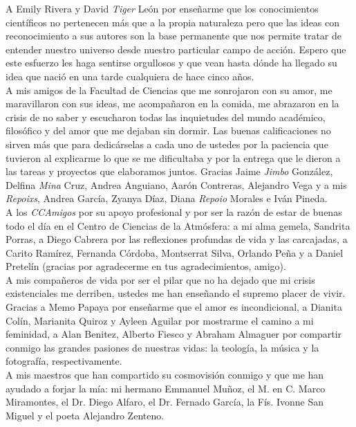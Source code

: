 A Emily Rivera y David \textit{Tiger} León por enseñarme que los conocimientos científicos no pertenecen más que a la propia naturaleza pero que las ideas con reconocimiento a sus autores son la base permanente que nos permite tratar de entender nuestro universo desde nuestro particular campo de acción. Espero que este esfuerzo les haga sentirse orgullosos y que vean hasta dónde ha llegado su idea que nació en una tarde cualquiera de hace cinco años.\\

A mis amigos de la Facultad de Ciencias que me sonrojaron con su amor, me maravillaron con sus ideas, me acompañaron en la comida, me abrazaron en la crisis de no saber y escucharon todas las inquietudes del mundo académico, filosófico y del amor que me dejaban sin dormir. Las buenas calificaciones no sirven más que para dedicárselas a cada uno de ustedes por la paciencia que tuvieron al explicarme lo que se me dificultaba y por la entrega que le dieron a las tareas y proyectos que elaboramos juntos. Gracias Jaime \textit{Jimbo} González, Delfina \textit{Mina} Cruz, Andrea Anguiano, Aarón Contreras, Alejandro Vega y a mis \textit{Repoixs}, Andrea García, Zyanya Díaz, Diana \textit{Repoio} Morales e Iván Pineda.\\

A los \textit{CCAmigos} por su apoyo profesional y por ser la razón de estar de buenas todo el día en el Centro de Ciencias de la Atmósfera: a mi alma gemela, Sandrita Porras, a Diego Cabrera por las reflexiones profundas de vida y las carcajadas, a Carito Ramírez, Fernanda Córdoba, Montserrat Silva, Orlando Peña y a Daniel Pretelín (gracias por agradecerme en tus agradecimientos, amigo).\\

A mis compañeros de vida por ser el pilar que no ha dejado que mi crisis existenciales me derriben, ustedes me han enseñando el supremo placer de vivir. Gracias a Memo Papaya por enseñarme que el amor es incondicional, a Dianita Colín, Marianita Quiroz y Ayleen Aguilar por mostrarme el camino a mi feminidad, a Alan Benitez, Alberto Fiesco y Abraham Almaguer por compartir conmigo las grandes pasiones de nuestras vidas: la teología, la música y la fotografía, respectivamente.\\

A mis maestros que han compartido su cosmovisión conmigo y que me han ayudado a forjar la mía: mi hermano Emmanuel Muñoz, el M. en C. Marco Miramontes, el Dr. Diego Alfaro, el Dr. Fernado García, la Fís. Ivonne San Miguel y el poeta Alejandro Zenteno.\\

